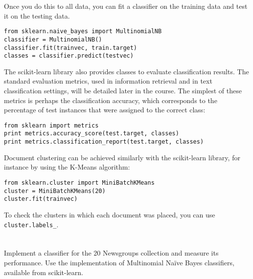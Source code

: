 \documentclass[12pt]{article}
\begin{document}
Once you do this to all data, you can fit a classifier on the training data and test it on the testing data.

\begin{verbatim}
from sklearn.naive_bayes import MultinomialNB
classifier = MultinomialNB()
classifier.fit(trainvec, train.target)
classes = classifier.predict(testvec)
\end{verbatim}

The scikit-learn library also provides classes to evaluate classification results. The standard evaluation metrics, used in information retrieval and in text classification settings, will be detailed later in the course. The simplest of these metrics is perhaps the classification accuracy, which corresponds to the percentage of test instances that were assigned to the correct class:

\begin{verbatim}
from sklearn import metrics
print metrics.accuracy_score(test.target, classes)
print metrics.classification_report(test.target, classes)
\end{verbatim}

Document clustering can be achieved similarly with the scikit-learn library, for instance by using the K-Means algorithm:

\begin{verbatim}
from sklearn.cluster import MiniBatchKMeans
cluster = MiniBatchKMeans(20)
cluster.fit(trainvec)
\end{verbatim}

To check the clusters in which each document was placed, you can use \verb+cluster.labels_+.

\section{}

Implement a classifier for the 20 Newsgroups collection and measure its performance. Use the implementation of Multinomial Na{\"i}ve Bayes classifiers, available from scikit-learn.

\section{}
\end{document}
